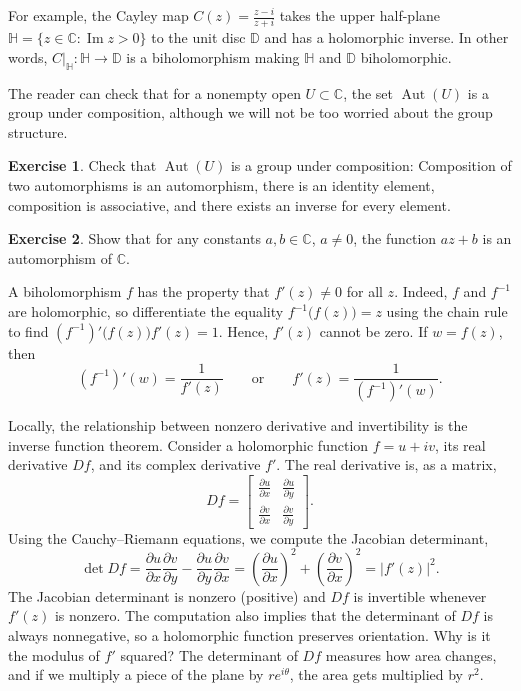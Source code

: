 \documentclass[12pt,openany]{book}
\renewcommand{\Im}{\operatorname{Im}}
\newcommand{\Aut}{\operatorname{Aut}}
\newcommand{\babs}[1]{\bigl\lvert {#1} \bigr\rvert}
\newcommand{\C}{{\mathbb{C}}}
\newcommand{\D}{{\mathbb{D}}}
\newcommand{\bH}{{\mathbb{H}}}
\theoremstyle{plain}
\theoremstyle{remark}
\theoremstyle{definition}
\newenvironment{exbox}{%
    \def\FrameCommand{\vrule width 1pt \relax\hspace{10pt}}%
    \MakeFramed{\advance\hsize-\width\FrameRestore}%
}{%
    \endMakeFramed
}
\theoremstyle{exercise}
\newtheorem{exercise}{Exercise}[section]
\theoremstyle{example}
\begin{document}
For example, the Cayley map
$C(z)
=
\frac{z - i}{z + i}$
takes the upper half-plane
$\bH = \{ z \in \C : \Im z > 0 \}$ to the unit disc $\D$ and
has a holomorphic inverse.
In other words, $C|_{\bH} \colon \bH \to \D$ is a biholomorphism
making $\bH$ and $\D$ biholomorphic.

The reader can check that for a nonempty open $U \subset \C$, the set
$\Aut(U)$ is a group under
composition, although we will not be too worried about the group
structure.

\begin{exbox}
\begin{exercise}
Check that
$\Aut(U)$ is a group under composition:
Composition of two automorphisms is an automorphism,
there is an identity element,
composition is associative,
and there exists an inverse for every element.
\end{exercise}

\begin{exercise}
Show that for any constants $a,b \in \C$, $a \not= 0$, the function
$a z + b$ is an automorphism of $\C$.
\end{exercise}
\end{exbox}

A biholomorphism $f$ has the property that $f'(z) \not= 0$ for all $z$.
Indeed,
$f$ and $f^{-1}$ are holomorphic, so differentiate the
equality
$f^{-1}\bigl(f(z)\bigr) = z$ using the chain rule to find
$(f^{-1})' \bigl(f(z)\bigr) f'(z) = 1$.  Hence, $f'(z)$ cannot be zero.
If $w = f(z)$, then
\begin{equation*}
(f^{-1})'(w) = \frac{1}{f'(z)}
\qquad \text{or} \qquad
f'(z) =
\frac{1}{(f^{-1})'(w)} .
\end{equation*}

Locally, the relationship between nonzero derivative and invertibility is
the inverse function theorem.  Consider a holomorphic function
$f = u+iv$, its real derivative $Df$, and its complex derivative $f'$.
The real derivative is, as a matrix,
\begin{equation*}
Df =
\begin{bmatrix}
\frac{\partial u}{\partial x} & \frac{\partial u}{\partial y} \\[5pt]
\frac{\partial v}{\partial x} & \frac{\partial v}{\partial y}
\end{bmatrix} .
\end{equation*}
Using the Cauchy--Riemann equations, we compute the Jacobian determinant,
\begin{equation*}
\det Df =
\frac{\partial u}{\partial x}
\frac{\partial v}{\partial y} -
\frac{\partial u}{\partial y} 
\frac{\partial v}{\partial x}
=
{\left(\frac{\partial u}{\partial x}\right)}^2
+
{\left(\frac{\partial v}{\partial x}\right)}^2
=
\babs{f'(z)}^2 .
\end{equation*}
The Jacobian determinant is nonzero (positive) and $Df$ is invertible
whenever $f'(z)$ is nonzero.
The computation also implies
that the determinant of
$Df$ is always nonnegative, so a holomorphic function preserves orientation.
Why is it the modulus of $f'$ squared? The determinant of $Df$
measures how area changes, and if we multiply a piece of the plane
by $r e^{i\theta}$, the area gets multiplied by $r^2$.
\end{document}
